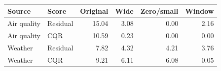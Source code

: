 \begin{tabular}{llrrrr}
\toprule
Source & Score & Original & Wide & Zero/small & Window \\
\midrule
Air quality & Residual & 15.04 & 3.08 & 0.00 & 2.16 \\
Air quality & CQR & 10.59 & 0.23 & 0.00 & 0.00 \\
Weather & Residual & 7.82 & 4.32 & 4.21 & 3.76 \\
Weather & CQR & 9.21 & 6.11 & 6.08 & 0.05 \\
\bottomrule
\end{tabular}

